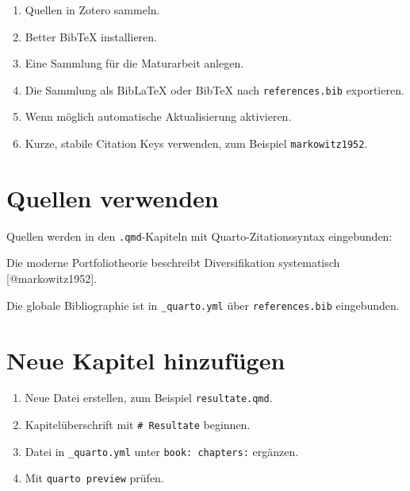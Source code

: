 \documentclass[
  ngerman,
  a4paper,
  DIV=11,
  oneside]{scrreprt}
\newenvironment{Shaded}{\begin{snugshade}}{\end{snugshade}}
\newcommand{\CommentTok}[1]{\textcolor[rgb]{0.37,0.37,0.37}{#1}}
\newcommand{\NormalTok}[1]{\textcolor[rgb]{0.00,0.23,0.31}{#1}}
\newcommand{\OtherTok}[1]{\textcolor[rgb]{0.00,0.23,0.31}{#1}}
\providecommand{\tightlist}{%
  \setlength{\itemsep}{0pt}\setlength{\parskip}{0pt}}
\begin{document}
\begin{enumerate}
\def\labelenumi{\arabic{enumi}.}
\tightlist
\item
  Quellen in Zotero sammeln.
\item
  Better BibTeX installieren.
\item
  Eine Sammlung für die Maturarbeit anlegen.
\item
  Die Sammlung als BibLaTeX oder BibTeX nach \texttt{references.bib}
  exportieren.
\item
  Wenn möglich automatische Aktualisierung aktivieren.
\item
  Kurze, stabile Citation Keys verwenden, zum Beispiel
  \texttt{markowitz1952}.
\end{enumerate}

\section{Quellen verwenden}\label{quellen-verwenden}

Quellen werden in den \texttt{.qmd}-Kapiteln mit Quarto-Zitationssyntax
eingebunden:

\begin{Shaded}
\begin{Highlighting}[]
\NormalTok{Die moderne Portfoliotheorie beschreibt Diversifikation systematisch }\CommentTok{[}\OtherTok{@markowitz1952}\CommentTok{]}\NormalTok{.}
\end{Highlighting}
\end{Shaded}

Die globale Bibliographie ist in \texttt{\_quarto.yml} über
\texttt{references.bib} eingebunden.

\section{Neue Kapitel hinzufügen}\label{neue-kapitel-hinzufuxfcgen}

\begin{enumerate}
\def\labelenumi{\arabic{enumi}.}
\tightlist
\item
  Neue Datei erstellen, zum Beispiel \texttt{resultate.qmd}.
\item
  Kapitelüberschrift mit \texttt{\#\ Resultate} beginnen.
\item
  Datei in \texttt{\_quarto.yml} unter \texttt{book:\ chapters:}
  ergänzen.
\item
  Mit \texttt{quarto\ preview} prüfen.
\end{enumerate}
\end{document}
